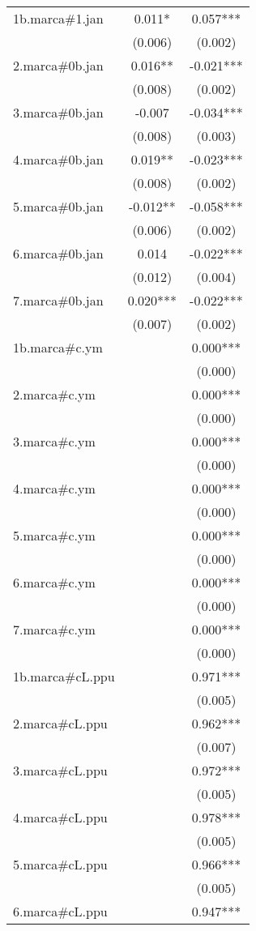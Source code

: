 \begin{tabular}{lcc}
1b.marca\#1.jan & 0.011* & 0.057*** \\
 & (0.006) & (0.002) \\
2.marca\#0b.jan & 0.016** & -0.021*** \\
 & (0.008) & (0.002) \\
3.marca\#0b.jan & -0.007 & -0.034*** \\
 & (0.008) & (0.003) \\
4.marca\#0b.jan & 0.019** & -0.023*** \\
 & (0.008) & (0.002) \\
5.marca\#0b.jan & -0.012** & -0.058*** \\
 & (0.006) & (0.002) \\
6.marca\#0b.jan & 0.014 & -0.022*** \\
 & (0.012) & (0.004) \\
7.marca\#0b.jan & 0.020*** & -0.022*** \\
 & (0.007) & (0.002) \\
1b.marca\#c.ym &  & 0.000*** \\
 &  & (0.000) \\
2.marca\#c.ym &  & 0.000*** \\
 &  & (0.000) \\
3.marca\#c.ym &  & 0.000*** \\
 &  & (0.000) \\
4.marca\#c.ym &  & 0.000*** \\
 &  & (0.000) \\
5.marca\#c.ym &  & 0.000*** \\
 &  & (0.000) \\
6.marca\#c.ym &  & 0.000*** \\
 &  & (0.000) \\
7.marca\#c.ym &  & 0.000*** \\
 &  & (0.000) \\
1b.marca\#cL.ppu &  & 0.971*** \\
 &  & (0.005) \\
2.marca\#cL.ppu &  & 0.962*** \\
 &  & (0.007) \\
3.marca\#cL.ppu &  & 0.972*** \\
 &  & (0.005) \\
4.marca\#cL.ppu &  & 0.978*** \\
 &  & (0.005) \\
5.marca\#cL.ppu &  & 0.966*** \\
 &  & (0.005) \\
6.marca\#cL.ppu &  & 0.947*** \\

\end{tabular}
